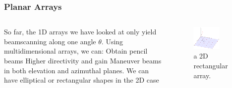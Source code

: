 \documentclass[10pt]{beamer}
\begin{document}
\begin{frame}
        \frametitle{Planar Arrays}
        \begin{columns}[T]
            \begin{column}{.4\textwidth}
                \begin{outline}
                    \1 So far, the 1D arrays we have looked at only yield beamscanning along one angle $\theta$.
                    \1 Using multidimensional arrays, we can:
                    \2 Obtain pencil beams
                    \2 Higher directivity and gain
                    \2 Maneuver beams in both elevation and azimuthal planes.
                    \1 We can have elliptical or rectangular shapes in the 2D case
                \end{outline}
            \end{column}
            \begin{column}{.6\textwidth}
                \begin{figure}[h!]
                    \centering
                    \includegraphics[width=0.65\textwidth]{planar_array.pdf}
                    \caption{a 2D rectangular array.}
                \end{figure}
            \end{column}
        \end{columns}
\end{frame}
\end{document}
